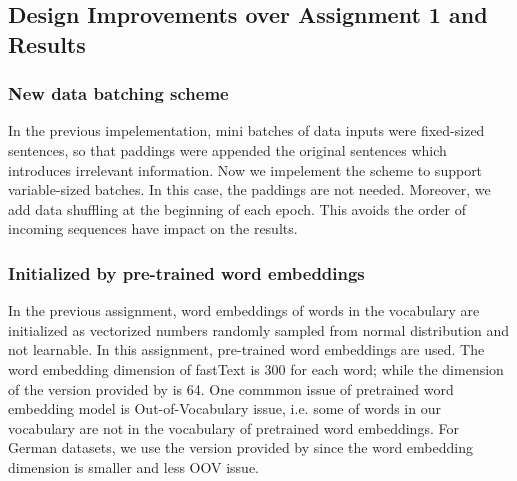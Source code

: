 \documentclass[11pt,a4paper]{article}
\begin{document}



\subsection{Design Improvements over Assignment 1 and Results}



\subsubsection{New data batching scheme}
In the previous impelementation, mini batches of data inputs were fixed-sized sentences, so that paddings were appended the original sentences which introduces irrelevant information. Now we impelement the scheme to support variable-sized batches. In this case, the paddings are not needed. Moreover, we add data shuffling at the beginning of each epoch. This avoids the order of incoming sequences have impact on the results.

\subsubsection{Initialized by pre-trained word embeddings}
In the previous assignment, word embeddings of words in the vocabulary are initialized as vectorized numbers randomly sampled from normal distribution and not learnable. In this assignment, pre-trained word embeddings are used. The word embedding dimension of fastText is 300 for each word; while the dimension of the version provided by \citet{goyal2018continuous} is 64. One commmon issue of pretrained word embedding model is Out-of-Vocabulary issue, i.e. some of words in our vocabulary are not in the vocabulary of pretrained word embeddings. For German datasets, we use the version provided by \citet{goyal2018continuous} since the word embedding dimension is smaller and less OOV issue.
\end{document}
